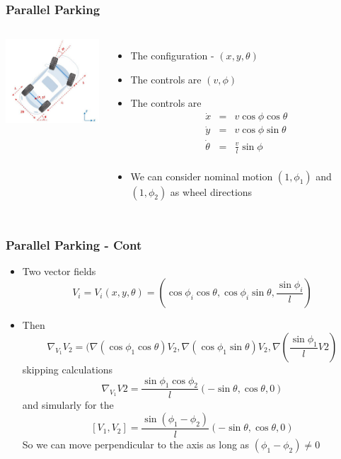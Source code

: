 \documentclass[10pt]{beamer}
\begin{document}
\begin{frame}
  \frametitle{Parallel Parking}
  \begin{columns}
    \column{5cm}
    \vfill
    \centerline{\includegraphics[width=4.9cm]{parallel-parking}}
    \vfill
    \column{6cm}
    \begin{itemize}
    \item The configuration - $(x, y, \theta)$
    \item The controls are $(v, \phi)$
    \item The controls are
      \[
        \begin{array}{rcl}
          \dot{x}& = & v \cos \phi \cos \theta\\
          \dot{y}& = & v \cos \phi \sin \theta\\
          \dot{\theta} & = & \frac{v}{l} \sin \phi\\
        \end{array}
      \]
    \item We can consider nominal motion $(1, \phi_1)$ and $(1, \phi_2)$ as wheel directions
    \end{itemize}
  \end{columns}
\end{frame}
\begin{frame}
  \frametitle{Parallel Parking - Cont}
  \begin{itemize}
    \item Two vector fields
      \[ V_i = V_i(x,y,\theta) =
        (\cos \phi_i \cos\theta, \cos\phi_i \sin\theta, \frac{\sin \phi_i}{l})
      \]
    \item Then
      \[
        \nabla_{V_1} V_2 = (\nabla(\cos\phi_1 \cos \theta) V_2,
        \nabla(\cos \phi_1 \sin \theta) V_2, \nabla(\frac{\sin \phi_1}{l} V2)
      \] skipping calculations
      \[
        \nabla_{V_1} V2 = \frac{\sin \phi_1 \cos \phi_2}{l}(-\sin \theta, \cos \theta, 0)
      \]  and simularly for the 
      \[
        [V_1, V_2] = \frac{\sin(\phi_1 - \phi_2)}{l} (-\sin \theta, \cos \theta, 0)
      \] So we can move perpendicular to the axis as long as $(\phi_1-\phi_2)\neq 0 $
  \end{itemize}
\end{frame}
\end{document}
